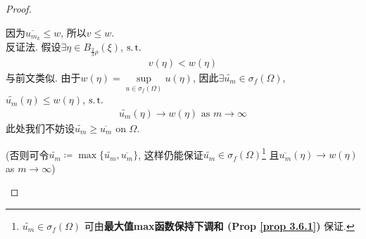 \begin{thm}
\begin{proof}
\begin{enumerate}
				\vspace*{1em}
				
				因为$\overline{u_{m_k}} \leq w$, 所以$v \leq w$. \\
				反证法. 假设$\exists \eta \in B_{\tfrac{2}{3}\rho}(\xi)$, $\operatorname{s.t.}$ 
				\begin{align*}
					v(\eta) < w(\eta)
				\end{align*}
				与前文类似. 由于$w(\eta) = \underset{u \in \sigma_{f}(\Omega)}{\sup} u(\eta)$, 因此$\exists \widetilde{u_m} \in \sigma_{f}(\Omega)$, $\widetilde{u_{m}}(\eta) \leq w(\eta)$, $\operatorname{s.t.}$
				\begin{align*}
					\widetilde{u_{m}}(\eta) \to w(\eta) \,\, \text{as} \,\, m \to \infty
				\end{align*}
				此处我们不妨设$\widetilde{u_m} \geq \overline{u_m}$ on $\Omega$. 
				\begin{center}
					(否则可令$\widetilde{u_m} \coloneqq \max \{ \widetilde{u_m} , \overline{u_m} \}$, 这样仍能保证$\widetilde{u_m} \in \sigma_{f}(\Omega)$\footnote{$\widetilde{u_m} \in \sigma_{f}(\Omega)$ 可由\textbf{最大值max函数保持下调和 (Prop \ref{prop 3.6.1})} 保证. } 且$\overline{u_m}(\eta) \to w(\eta)$ as $m \to \infty$)
				\end{center}
				
				\newpage
				

\end{enumerate}
\end{proof}
\end{thm}
